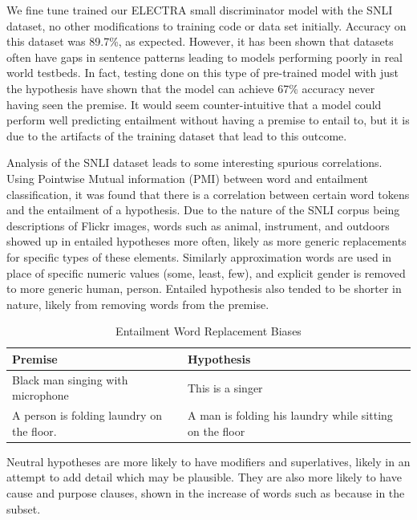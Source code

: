 \documentclass[11pt]{article}
\begin{document}
We fine tune trained our ELECTRA small discriminator model with the SNLI dataset, no other modifications to training code or data set initially.  Accuracy on this dataset was 89.7\%, as expected. However, it has been shown that datasets often have gaps in sentence patterns leading to models performing poorly in real world testbeds. In fact, testing done on this type of pre-trained model with just the hypothesis have shown that the model can achieve 67\% accuracy never having seen the premise.  It would seem counter-intuitive that a model could perform well predicting entailment without having a premise to entail to, but it is due to the artifacts of the training dataset that lead to this outcome.  \citealp{princeton} \citealp{premise4granted}

Analysis of the SNLI dataset leads to some interesting spurious correlations. Using Pointwise Mutual information (PMI) between word and entailment classification, it was found that there is a correlation between certain word tokens and the entailment of a hypothesis. Due to the nature of the SNLI corpus being descriptions of Flickr images, words such as animal, instrument, and outdoors showed up in entailed hypotheses more often, likely as more generic replacements for specific types of these elements. Similarly approximation words are used in place of specific numeric values (some, least, few), and explicit gender is removed to more generic human, person. Entailed hypothesis also tended to be shorter in nature, likely from removing words from the premise.

\begin{table}[h!]
    \centering
    \begin{tabularx}{0.45\textwidth} { 
  | >{\raggedright\arraybackslash}X 
  | >{\raggedright\arraybackslash}X | }
    \hline
    Premise & Hypothesis \\
    \hline\hline
        Black man singing with microphone & This is a singer \\
        \hline
        A person is folding laundry on the floor. & A man is folding his laundry while sitting on the floor \\
        \hline
    \end{tabularx}
    \caption{Entailment Word Replacement Biases}
    \label{tab:EWRB}
\end{table}

Neutral hypotheses are more likely to have modifiers and superlatives, likely in an attempt to add detail which may be plausible.  They are also more likely to have cause and purpose clauses, shown in the increase of words such as because in the subset.  
\end{document}
